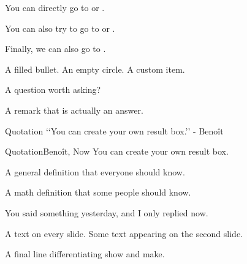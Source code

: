 \documentclass{slixte}
\begin{document}
\begin{slide}
    You can directly go to  or .
    
    \spacing
    
    You can also try to go to  or .
    
    \spacing[2]
    
    Finally, we can also go to \tosection{}.
\end{slide}

\begin{slide}
    \begin{itemize}
        \fillitem A filled bullet.
        \emptyitem[second] An empty circle.
         A custom item.
    \end{itemize}

    \begin{question}A question worth asking?\end{question}
    \begin{remark}[Answer]
        A remark that is actually an answer.
    \end{remark}
\end{slide}

\begin{slide}
    \begin{result}{Quotation}{}
        ‘‘You can create your own result box.’’ - Beno{\^i}t
    \end{result}

    \begin{result}{Quotation}{Beno{\^i}t, Now}
        You can create your own result box.
    \end{result}
\end{slide}

\begin{slide}
    \begin{definition}
        A general definition that everyone should know.
    \end{definition}

    \begin{definition}[Math]
        A math definition that some people should know.
    \end{definition}
\end{slide}

\begin{slide}
    You said something yesterday,
    and I only replied now.

    A text on every slide.
    \break
    Some text appearing on the second slide.
    
    
    
    A final line differentiating show and make.
\end{slide}
{}
\makeref
\end{document}
